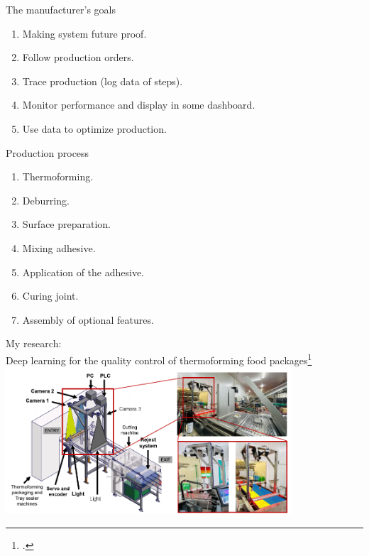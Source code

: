 \documentclass{beamer}
\begin{document}
	\begin{frame}{The manufacturer's goals}
		\begin{enumerate}
			\item Making system future proof.
			\item Follow production orders.
			\item Trace production (log data of steps).
			\item Monitor performance and display in some dashboard.
			\item Use data to optimize production.			
		\end{enumerate}
	\end{frame}

	\begin{frame}{Production process}
		\begin{enumerate}
			\item Thermoforming.
			\item Deburring.
			\item Surface preparation.
			\item Mixing adhesive.
			\item Application of the adhesive.
			\item Curing joint.
			\item Assembly of optional features.
		\end{enumerate}
	\end{frame}
	
	\begin{frame}{My research:\\Deep learning for the quality control of thermoforming food packages\footcite{Banus2021}}
		\centering
		\includegraphics[width=0.8\textwidth]{Figures/QualityControlInThermoformingSetup.pdf}
	\end{frame}
\end{document}
